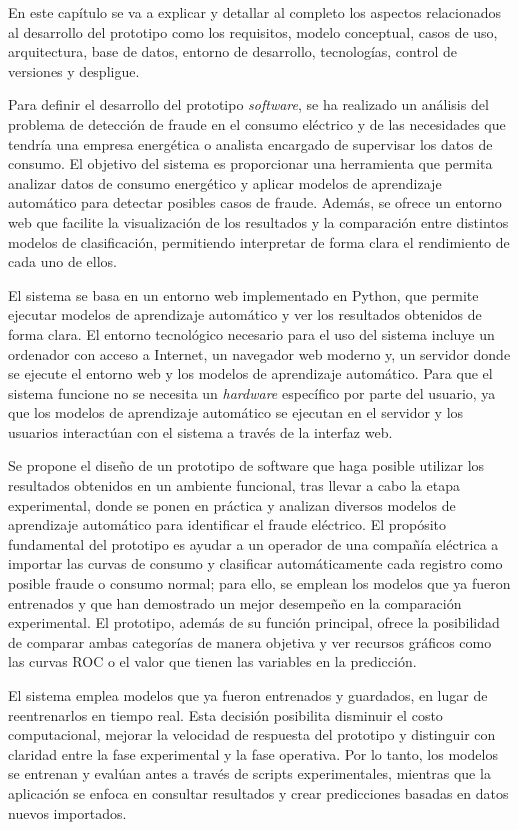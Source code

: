 \documentclass[12pt,a4paper]{report}
\begin{document}
En este capítulo se va a explicar y detallar al completo los aspectos relacionados al desarrollo del prototipo como los requisitos, modelo conceptual, casos de uso, arquitectura, base de datos, entorno de desarrollo, tecnologías, control de versiones y despligue.

Para definir el desarrollo del prototipo \emph{software}, se ha realizado un análisis del problema de detección de fraude en el consumo eléctrico y de las necesidades que tendría una empresa energética o analista encargado de supervisar los datos de consumo. El objetivo del sistema es proporcionar una herramienta que permita analizar datos de consumo energético y aplicar modelos de aprendizaje automático para detectar posibles casos de fraude. Además, se ofrece un entorno web que facilite la visualización de los resultados y la comparación entre distintos modelos de clasificación, permitiendo interpretar de forma clara el rendimiento de cada uno de ellos.

El sistema se basa en un entorno web implementado en Python, que permite ejecutar modelos de aprendizaje automático y ver los resultados obtenidos de forma clara. El entorno tecnológico necesario para el uso del sistema incluye un ordenador con acceso a Internet, un navegador web moderno y, un servidor donde se ejecute el entorno web y los modelos de aprendizaje automático. Para que el sistema funcione no se necesita un \emph{hardware} específico por parte del usuario, ya que los modelos de aprendizaje automático se ejecutan en el servidor y los usuarios interactúan con el sistema a través de la interfaz web.

Se propone el diseño de un prototipo de software que haga posible utilizar los resultados obtenidos en un ambiente funcional, tras llevar a cabo la etapa experimental, donde se ponen en práctica y analizan diversos modelos de aprendizaje automático para identificar el fraude eléctrico. El propósito fundamental del prototipo es ayudar a un operador de una compañía eléctrica a importar las curvas de consumo y clasificar automáticamente cada registro como posible fraude o consumo normal; para ello, se emplean los modelos que ya fueron entrenados y que han demostrado un mejor desempeño en la comparación experimental. El prototipo, además de su función principal, ofrece la posibilidad de comparar ambas categorías de manera objetiva y ver recursos gráficos como las curvas ROC o el valor que tienen las variables en la predicción. 

El sistema emplea modelos que ya fueron entrenados y guardados, en lugar de reentrenarlos en tiempo real. Esta decisión posibilita disminuir el costo computacional, mejorar la velocidad de respuesta del prototipo y distinguir con claridad entre la fase experimental y la fase operativa. Por lo tanto, los modelos se entrenan y evalúan antes a través de scripts experimentales, mientras que la aplicación se enfoca en consultar resultados y crear predicciones basadas en datos nuevos importados.
\end{document}
